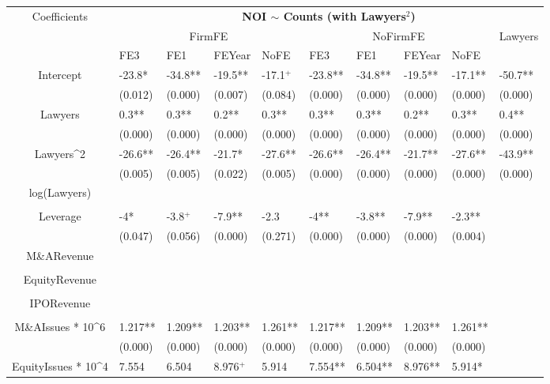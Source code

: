 \documentclass{article}
\begin{document}
\begin{table}[H]
\centering
\begin{tabular}{|clllllllll|}
\hline
\multirow{3}{*}{Coefficients} & \multicolumn{9}{c|}{\textbf{NOI $\sim$ Counts (with Lawyers$^2$)}} \\
\cline{2-10}
& \multicolumn{4}{c}{FirmFE} & \multicolumn{4}{c}{NoFirmFE} & \multirow{2}{*}{Lawyers} \\
\cline{2-9}
& FE3 & FE1 & FEYear & NoFE & FE3 & FE1 & FEYear & NoFE &  \\
\hline
 
Intercept & -23.8* & -34.8** & -19.5** & -17.1$^{+}$ & -23.8** & -34.8** & -19.5** & -17.1** & -50.7** \\ 
   & (0.012) & (0.000) & (0.007) & (0.084) & (0.000) & (0.000) & (0.000) & (0.000) & (0.000) \\ 
  Lawyers & 0.3** & 0.3** & 0.2** & 0.3** & 0.3** & 0.3** & 0.2** & 0.3** & 0.4** \\ 
   & (0.000) & (0.000) & (0.000) & (0.000) & (0.000) & (0.000) & (0.000) & (0.000) & (0.000) \\ 
  Lawyers^2 & -26.6** & -26.4** & -21.7* & -27.6** & -26.6** & -26.4** & -21.7** & -27.6** & -43.9** \\ 
   & (0.005) & (0.005) & (0.022) & (0.005) & (0.000) & (0.000) & (0.000) & (0.000) & (0.000) \\ 
  log(Lawyers) &  &  &  &  &  &  &  &  &  \\ 
   &  &  &  &  &  &  &  &  &  \\ 
  Leverage & -4* & -3.8$^{+}$ & -7.9** & -2.3 & -4** & -3.8** & -7.9** & -2.3** &  \\ 
   & (0.047) & (0.056) & (0.000) & (0.271) & (0.000) & (0.000) & (0.000) & (0.004) &  \\ 
  M\&ARevenue &  &  &  &  &  &  &  &  &  \\ 
   &  &  &  &  &  &  &  &  &  \\ 
  EquityRevenue &  &  &  &  &  &  &  &  &  \\ 
   &  &  &  &  &  &  &  &  &  \\ 
  IPORevenue &  &  &  &  &  &  &  &  &  \\ 
   &  &  &  &  &  &  &  &  &  \\ 
  M\&AIssues * 10^6 & 1.217** & 1.209** & 1.203** & 1.261** & 1.217** & 1.209** & 1.203** & 1.261** &  \\ 
   & (0.000) & (0.000) & (0.000) & (0.000) & (0.000) & (0.000) & (0.000) & (0.000) &  \\ 
  EquityIssues * 10^4 & 7.554 & 6.504 & 8.976$^{+}$ & 5.914 & 7.554** & 6.504** & 8.976** & 5.914* &  \\ 

\end{tabular}
\end{table}
\end{document}
